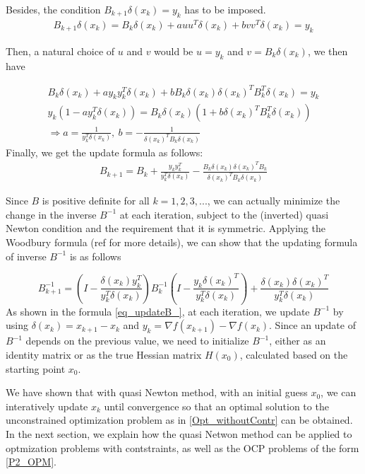 \documentclass  [
  paper    = a4,
  BCOR     = 10mm,
  twoside,
  fontsize = 12pt,
  fleqn,
  toc      = bibnumbered,
  toc      = listofnumbered,
  numbers  = noendperiod,
  headings = normal,
  listof   = leveldown,
  version  = 3.03
]                                       {scrreprt}
\newcommand{\<}{\langle}
\renewcommand{\>}{\rangle}
\begin{document}
Besides, the condition $B_{k+1}\delta(x_k) = y_k$ has to be imposed.
\begin{align*}
	B_{k+1}\delta(x_k) = B_k\delta(x_k)  + a u u^T\delta(x_k) + b v v^T\delta(x_k) = y_k
\end{align*}

Then, a natural choice of $u$ and $v$ would be $u=y_k$ and $v=B_k\delta(x_k)$, we then have

\begin{align*}
	B_k\delta(x_k) + a y_ky^T_k\delta(x_k) + bB_k\delta(x_k) \delta(x_k)^TB_k^T\delta(x_k) = y_k  \\
	y_k(1-ay_k^T\delta(x_k) ) = B_k\delta(x_k)(1+ b \delta(x_k)^TB_k^T\delta(x_k)) \\
	\Rightarrow a = \frac{1}{y_k^T\delta(x_k)}, \  b= - \frac{1}{\delta(x_k)^TB_k\delta(x_k)}
\end{align*}
Finally, we get the update formula as follows: 
\begin{align*}
	B_{k+1} = B_k +  \frac{y_ky_k^T}{y_k^T\delta(x_k)}  - \frac{B_k\delta(x_k)\delta(x_k)^TB_k}{\delta(x_k)^TB_k\delta(x_k)}
\end{align*}

Since $B$ is positive definite for all $k = 1,2, 3, ...$, we can actually minimize the change in the inverse $B^{-1}$ at each iteration, subject to the (inverted) quasi Newton condition and the requirement that it is symmetric. Applying the Woodbury formula (ref \cite{Wood50} for more details), we can show that the updating formula of inverse $B^{-1}$ is as follows

\begin{equation}
	B_{k+1}^{-1} = (I - \frac{\delta(x_k)y_k^T}{y_k^T\delta(x_k)})B_k^{-1}(I - \frac{y_k\delta(x_k)^T}{y_k^T\delta(x_k)}) +  \frac{\delta(x_k)\delta(x_k)^T}{y_k^T\delta(x_k)} 
	\label{eq_updateB_}
\end{equation}
As shown in the formula \ref{eq_updateB_}, at each iteration, we update $B^{-1}$ by using  $\delta(x_k) = x_{k+1} -x_k$ and $y_k = \nabla f(x_{k+1}) - \nabla f(x_k)$. Since an update of $B^{-1}$ depends on the previous value, we need to initialize $B^{-1}$, either as an identity matrix or as the true Hessian matrix $H(x_0)$, calculated based on the starting point $x_0$.


We have shown that with quasi Newton method, with an initial guess $x_0$,  we can interatively update $x_k$ until convergence so that an optimal solution to the unconstrained optimization problem as in \ref{Opt_withoutContr} can be obtained. In the next section, we explain how the quasi Netwon method can be applied to optmization problems with contstraints, as well as the OCP problems of the form \ref{P2_OPM}.
\end{document}
